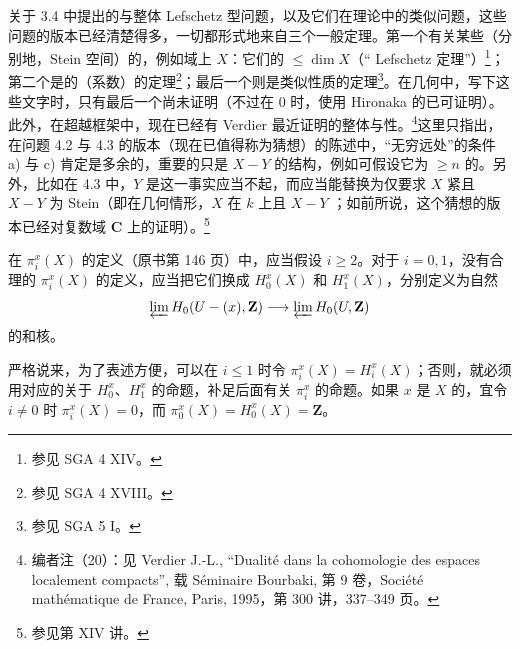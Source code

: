 关于 3.4 中提出的与整体 Lefschetz 型问题，以及它们在理论中的类似问题，这些问题的版本已经清楚得多，一切都形式地来自三个一般定理。第一个有关某些（分别地，Stein 空间）的，例如域上 $X$：它们的 $\leq\dim X$（“ Lefschetz 定理”）\footnote{参见 SGA 4 XIV。}；第二个是的（系数）的定理\footnote{参见 SGA 4 XVIII。}；最后一个则是类似性质的定理\footnote{参见 SGA 5 I。}。在几何中，写下这些文字时，只有最后一个尚未证明（不过在 $0$ 时，使用 Hironaka 的已可证明）。此外，在超越框架中，现在已经有 Verdier 最近证明的整体与性。\footnote{编者注（20）：见 Verdier J.-L., “Dualité dans la cohomologie des espaces localement compacts”, 载 Séminaire Bourbaki, 第 9 卷，Société mathématique de France, Paris, 1995，第 300 讲，337--349 页。}这里只指出，在问题 4.2 与 4.3 的版本（现在已值得称为猜想）的陈述中，“无穷远处”的条件 a) 与 c) 肯定是多余的，重要的只是
$X-Y$ 的结构，例如可假设它为 $\geq n$ 的。另外，比如在 4.3 中，$Y$ 是这一事实应当不起，而应当能替换为仅要求 $X$ 紧且 $X-Y$ 为 Stein（即在几何情形，$X$ 在 $k$ 上且 $X-Y$ ；如前所说，这个猜想的版本已经对复数域 $\mathbf C$ 上的证明）。\footnote{参见第 XIV 讲。}

在 $\pi_i^x(X)$ 的定义（原书第 146 页）中，应当假设 $i\geq2$。对于 $i=0,1$，没有合理的 $\pi_i^x(X)$ 的定义，应当把它们换成 $H_0^x(X)$ 和 $H_1^x(X)$，分别定义为自然
\[
\varprojlim H_0(U-(x),\mathbf Z)\longrightarrow\varprojlim H_0(U,\mathbf Z)
\]
的和核。

严格说来，为了表述方便，可以在 $i\leq1$ 时令 $\pi_i^x(X)=H_i^x(X)$；否则，就必须用对应的关于 $H_0^x$、$H_1^x$ 的命题，补足后面有关 $\pi_i^x$ 的命题。如果 $x$ 是 $X$ 的，宜令 $i\ne0$ 时 $\pi_i^x(X)=0$，而 $\pi_0^x(X)=H_0^x(X)=\mathbf Z$。

